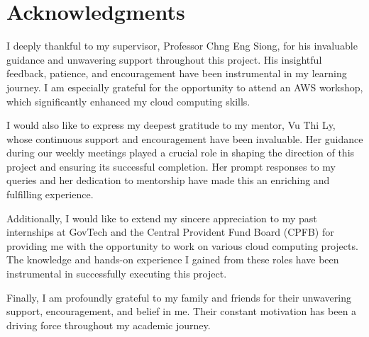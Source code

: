 \chapter*{Acknowledgments}

I deeply thankful to my supervisor, Professor Chng Eng Siong, for his invaluable guidance and unwavering support throughout this project. His insightful feedback, patience, and encouragement have been instrumental in my learning journey. I am especially grateful for the opportunity to attend an AWS workshop, which significantly enhanced my cloud computing skills. 

I would also like to express my deepest gratitude to my mentor, Vu Thi Ly, whose continuous support and encouragement have been invaluable. Her guidance during our weekly meetings played a crucial role in shaping the direction of this project and ensuring its successful completion. Her prompt responses to my queries and her dedication to mentorship have made this an enriching and fulfilling experience.

Additionally, I would like to extend my sincere appreciation to my past internships at GovTech and the Central Provident Fund Board (CPFB) for providing me with the opportunity to work on various cloud computing projects. The knowledge and hands-on experience I gained from these roles have been instrumental in successfully executing this project.

Finally, I am profoundly grateful to my family and friends for their unwavering support, encouragement, and belief in me. Their constant motivation has been a driving force throughout my academic journey.
